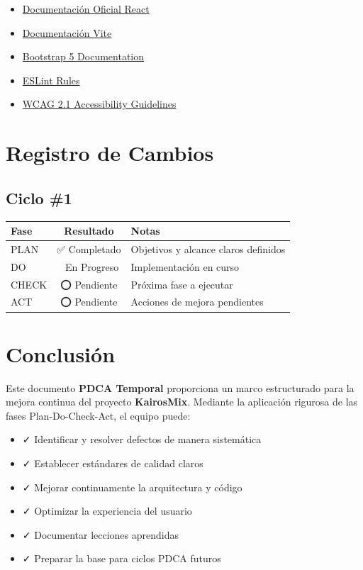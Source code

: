 \documentclass[12pt,a4paper]{report}
\begin{document}
\begin{itemize}
    \item \href{https://react.dev}{Documentación Oficial React}
    \item \href{https://vitejs.dev}{Documentación Vite}
    \item \href{https://getbootstrap.com/docs/5.0}{Bootstrap 5 Documentation}
    \item \href{https://eslint.org/docs/rules}{ESLint Rules}
    \item \href{https://www.w3.org/WAI/WCAG21/quickref}{WCAG 2.1 Accessibility Guidelines}
\end{itemize}

\chapter*{Registro de Cambios}

\section*{Ciclo \#1}

\begin{table}[h]
    \centering
    \begin{tabular}{|l|c|p{8cm}|}
        \hline
        \rowcolor{grisClaro}
        \textbf{Fase} & \textbf{Resultado} & \textbf{Notas} \\
        \hline
        PLAN & ✅ Completado & Objetivos y alcance claros definidos \\
        \hline
        DO & 🔄 En Progreso & Implementación en curso \\
        \hline
        CHECK & ⭕ Pendiente & Próxima fase a ejecutar \\
        \hline
        ACT & ⭕ Pendiente & Acciones de mejora pendientes \\
        \hline
    \end{tabular}
\end{table}

\chapter*{Conclusión}

Este documento \textcolor{cafeOscuro}{\textbf{PDCA Temporal}} proporciona un marco estructurado para la mejora continua del proyecto \textbf{KairosMix}. Mediante la aplicación rigurosa de las fases Plan-Do-Check-Act, el equipo puede:

\begin{itemize}
    \item ✓ Identificar y resolver defectos de manera sistemática
    \item ✓ Establecer estándares de calidad claros
    \item ✓ Mejorar continuamente la arquitectura y código
    \item ✓ Optimizar la experiencia del usuario
    \item ✓ Documentar lecciones aprendidas
    \item ✓ Preparar la base para ciclos PDCA futuros
\end{itemize}
\end{document}
